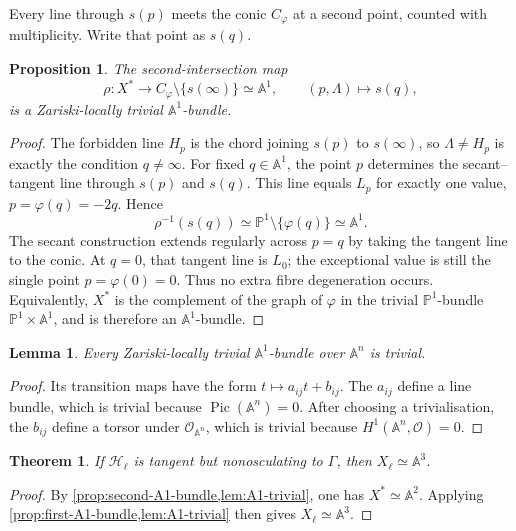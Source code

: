 \documentclass[11pt,reqno]{amsart}
\newtheorem{theorem}{Theorem}[section]
\newtheorem{proposition}[proposition]{Proposition}
\newtheorem{lemma}[lemma]{Lemma}
\theoremstyle{definition}
\theoremstyle{remark}
\newcommand{\A}{\mathbb A}
\newcommand{\Pj}{\mathbb P}
\newcommand{\OO}{\mathcal O}
\newcommand{\cH}{\mathscr H}
\newcommand{\Pic}{\operatorname{Pic}}
\begin{document}
Every line through $s(p)$ meets the conic $C_\varphi$ at a second point,
counted with multiplicity.  Write that point as $s(q)$.

\begin{proposition}\label{prop:second-A1-bundle}
The second-intersection map
\[
 \rho:X^*\longrightarrow C_\varphi\setminus\{s(\infty)\}
 \simeq\A^1,
 \qquad (p,\Lambda)\longmapsto s(q),
\]
is a Zariski-locally trivial $\A^1$-bundle.
\end{proposition}

\begin{proof}
The forbidden line $H_p$ is the chord joining $s(p)$ to $s(\infty)$, so
$\Lambda\ne H_p$ is exactly the condition $q\ne\infty$.  For fixed
$q\in\A^1$, the point $p$ determines the secant--tangent line through
$s(p)$ and $s(q)$.  This line equals $L_p$ for exactly one value,
$p=\varphi(q)=-2q$.  Hence
\[
 \rho^{-1}(s(q))\simeq\Pj^1\setminus\{\varphi(q)\}\simeq\A^1.
\]
The secant construction extends regularly across $p=q$ by taking the
tangent line to the conic.  At $q=0$, that tangent line is $L_0$; the
exceptional value is still the single point $p=\varphi(0)=0$.  Thus no
extra fibre degeneration occurs.  Equivalently,
$X^*$ is the complement of the graph of $\varphi$ in the trivial
$\Pj^1$-bundle $\Pj^1\times\A^1$, and is therefore an $\A^1$-bundle.
\end{proof}

\begin{lemma}\label{lem:A1-trivial}
Every Zariski-locally trivial $\A^1$-bundle over $\A^n$ is trivial.
\end{lemma}

\begin{proof}
Its transition maps have the form $t\mapsto a_{ij}t+b_{ij}$.  The
$a_{ij}$ define a line bundle, which is trivial because
$\Pic(\A^n)=0$.  After choosing a trivialisation, the $b_{ij}$ define a
torsor under $\OO_{\A^n}$, which is trivial because
$H^1(\A^n,\OO)=0$.
\end{proof}

\begin{theorem}\label{thm:tangent-A3}
If $\cH_\ell$ is tangent but nonosculating to $\Gamma$, then
$X_\ell\simeq\A^3$.
\end{theorem}

\begin{proof}
By \cref{prop:second-A1-bundle,lem:A1-trivial}, one has
$X^*\simeq\A^2$.  Applying \cref{prop:first-A1-bundle,lem:A1-trivial}
then gives $X_\ell\simeq\A^3$.
\end{proof}
\end{document}
